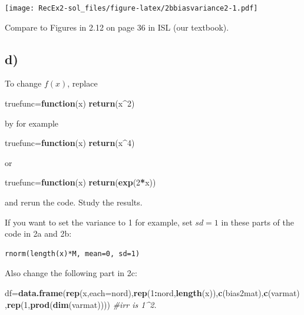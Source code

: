 \documentclass[]{article}
\newenvironment{Shaded}{\begin{snugshade}}{\end{snugshade}}
\newcommand{\KeywordTok}[1]{\textcolor[rgb]{0.13,0.29,0.53}{\textbf{#1}}}
\newcommand{\DataTypeTok}[1]{\textcolor[rgb]{0.13,0.29,0.53}{#1}}
\newcommand{\DecValTok}[1]{\textcolor[rgb]{0.00,0.00,0.81}{#1}}
\newcommand{\CommentTok}[1]{\textcolor[rgb]{0.56,0.35,0.01}{\textit{#1}}}
\newcommand{\ControlFlowTok}[1]{\textcolor[rgb]{0.13,0.29,0.53}{\textbf{#1}}}
\newcommand{\OperatorTok}[1]{\textcolor[rgb]{0.81,0.36,0.00}{\textbf{#1}}}
\newcommand{\NormalTok}[1]{#1}
\begin{document}
\texttt{[image: RecEx2-sol\_files/figure-latex/2bbiasvariance2-1.pdf]}

Compare to Figures in 2.12 on page 36 in ISL (our textbook).

\subsection{d)}\label{d}

To change \(f(x)\), replace

\begin{Shaded}
\begin{Highlighting}[]
\NormalTok{truefunc=}\ControlFlowTok{function}\NormalTok{(x) }\KeywordTok{return}\NormalTok{(x}\OperatorTok{^}\DecValTok{2}\NormalTok{)}
\end{Highlighting}
\end{Shaded}

by for example

\begin{Shaded}
\begin{Highlighting}[]
\NormalTok{truefunc=}\ControlFlowTok{function}\NormalTok{(x) }\KeywordTok{return}\NormalTok{(x}\OperatorTok{^}\DecValTok{4}\NormalTok{)}
\end{Highlighting}
\end{Shaded}

or

\begin{Shaded}
\begin{Highlighting}[]
\NormalTok{truefunc=}\ControlFlowTok{function}\NormalTok{(x) }\KeywordTok{return}\NormalTok{(}\KeywordTok{exp}\NormalTok{(}\DecValTok{2}\OperatorTok{*}\NormalTok{x))}
\end{Highlighting}
\end{Shaded}

and rerun the code. Study the results.

If you want to set the variance to 1 for example, set \(sd=1\) in these
parts of the code in 2a and 2b:

\begin{verbatim}
rnorm(length(x)*M, mean=0, sd=1)
\end{verbatim}

Also change the following part in 2c:

\begin{Shaded}
\begin{Highlighting}[]
\NormalTok{df=}\KeywordTok{data.frame}\NormalTok{(}\KeywordTok{rep}\NormalTok{(x,}\DataTypeTok{each=}\NormalTok{nord),}\KeywordTok{rep}\NormalTok{(}\DecValTok{1}\OperatorTok{:}\NormalTok{nord,}\KeywordTok{length}\NormalTok{(x)),}\KeywordTok{c}\NormalTok{(bias2mat),}\KeywordTok{c}\NormalTok{(varmat),}\KeywordTok{rep}\NormalTok{(}\DecValTok{1}\NormalTok{,}\KeywordTok{prod}\NormalTok{(}\KeywordTok{dim}\NormalTok{(varmat)))) }\CommentTok{#irr is 1^2.}
\end{Highlighting}
\end{Shaded}
\end{document}
